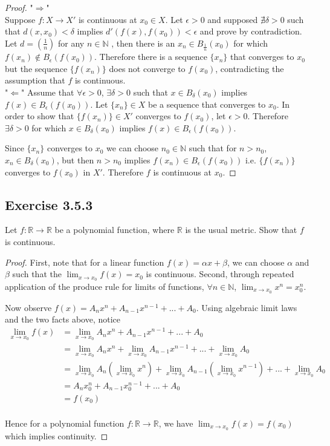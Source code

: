 \documentclass{tufte-book}
\theoremstyle{mytheoremstyle}
\theoremstyle{mylemstyle}
\theoremstyle{mydefstyle}
\begin{document}
\begin{proof}"$\Rightarrow$"\\
Suppose $f: X \rightarrow X'$ is continuous at $x_0 \in X$.  Let $\epsilon > 0$ and supposed $\nexists \delta>0$ such that $d(x, x_0) < \delta$ implies $d'(f(x), f(x_0)) < \epsilon$ and prove by contradiction.\\
Let $d = (\frac{1}{n})$ for any $n \in \mathbb{N}$ , then there is an $x_n \in B_\frac{1}{n}(x_0)$ for which $f(x_n) \not\in B_\epsilon(f(x_0))$.  Therefore there is a sequence $\{x_n\}$ that converges to $x_0$  but the sequence $\{f(x_n)\}$ does not converge to $f(x_0)$, contradicting the assumption that $f$ is continuous. \\
"$\Leftarrow$"
Assume that $\forall \epsilon > 0$, $\exists \delta >0$ such that $x \in B_\delta(x_0)$ implies $f(x) \in B_\epsilon(f(x_0))$.  Let $\{x_n\} \in X$ be a sequence that converges to $x_0$.  In order to show that $\{f(x_n)\} \in X'$ converges to $f(x_0)$, let $\epsilon >0$.  Therefore $\exists \delta >0$ for which $x \in B_\delta(x_0)$ implies $f(x) \in B_\epsilon(f(x_0))$.

Since $\{x_n\}$ converges to $x_0$ we can choose $n_0 \in \mathbb{N}$ such that for $n > n_0$, $x_n \in B_\delta(x_0)$, but then $n > n_0$ implies $f(x_n) \in B_\epsilon(f(x_0))$ i.e. $\{f(x_n)\}$ converges to $f(x_0)$ in $X'$.  Therefore $f$ is continuous at $x_0$.
\end{proof}

\subsection{Exercise 3.5.3}
Let $f: \mathbb{R} \rightarrow \mathbb{R}$ be a polynomial function, where $\mathbb{R}$ is the usual metric.  Show that $f$ is continuous.

\begin{proof}
First, note that for a linear function $f(x) = \alpha x + \beta$, we can choose $\alpha$ and $\beta$ such that the $\lim_{x \to x_0} f(x) = x_0$ is continuous.  Second, through repeated application of the produce rule for limits of functions, $\forall n \in \mathbb{N}$, $\lim_{x \to x_0} x^n = x_0^n$.

Now observe $f(x) = A_nx^n + A_{n-1}x^{n-1}+...+A_0$.  Using algebraic limit laws and the two facts above, notice
\begin{align*}
\lim_{x \to x_0} f(x) &= \lim_{x \to x_0}  A_nx^n + A_{n-1}x^{n-1}+...+A_0\\
&=  \lim_{x \to x_0} A_nx^n + \lim_{x \to x_0} A_{n-1}x^{n-1}+...+\lim_{x \to x_0} A_0\\
&= \lim_{x \to x_0} A_n (\lim_{x \to x_0}x^n) + \lim_{x \to x_0} A_{n-1} (\lim_{x \to x_0}x^{n-1})+...+\lim_{x \to x_0} A_0\\
&= A_nx_0^n + A_{n-1}x_0^{n-1}+...+A_0\\
&= f(x_0)\\
\end{align*}

Hence for a polynomial function $f: \mathbb{R} \rightarrow \mathbb{R}$, we have $\lim_{x \to x_0} f(x) = f(x_0)$ which implies continuity.
\end{proof}
\end{document}
